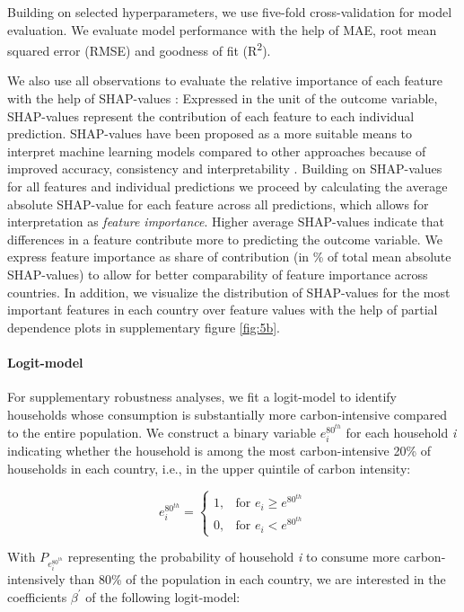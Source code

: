\documentclass[12pt, a4paper]{article}
\begin{document}
Building on selected hyperparameters, we use five-fold cross-validation for model evaluation. We evaluate model performance with the help of MAE, root mean squared error (RMSE) and goodness of fit (R\textsuperscript{2}). 

We also use all observations to evaluate the relative importance of each feature with the help of SHAP-values \autocite{Lundberg.2017}: Expressed in the unit of the outcome variable, SHAP-values represent the contribution of each feature to each individual prediction. SHAP-values have been proposed as a more suitable means to interpret machine learning models compared to other approaches because of improved accuracy, consistency and interpretability \autocite{Lundberg.2020}. Building on SHAP-values for all features and individual predictions we proceed by calculating the average absolute SHAP-value for each feature across all predictions, which allows for interpretation as \textit{feature importance}. Higher average SHAP-values indicate that differences in a feature contribute more to predicting the outcome variable. We express feature importance as share of contribution (in \% of total mean absolute SHAP-values) to allow for better comparability of feature importance across countries. In addition, we visualize the distribution of SHAP-values for the most important features in each country over feature values with the help of partial dependence plots in supplementary figure \ref{fig:5b}. 

\paragraph{Logit-model} For supplementary robustness analyses, we fit a logit-model to identify households whose consumption is substantially more carbon-intensive compared to the entire population. We construct a binary variable $e_{i}^{80^{th}}$ for each household \textit{i} indicating whether the household is among the most carbon-intensive 20\% of households in each country, i.e., in the upper quintile of carbon intensity:

\begin{equation}\label{eq:logit}
    e_{i}^{80^{th}} =
    \begin{cases}
    1, & \text{for }  e_{i} \geq e^{80^{th}} \\
    0, & \text{for }  e_{i} < e^{80^{th}}
    \end{cases}
\end{equation}

With $P_{e_{i}^{80^{th}}}$ representing the probability of household \textit{i} to consume more carbon-intensively than 80\% of the population in each country, we are interested in the coefficients $\beta^{'}$ of the following logit-model:
\end{document}
